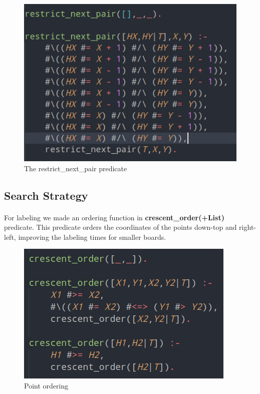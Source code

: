 \documentclass[runningheads]{llncs}
\begin{document}
\begin{figure}
    \begin{center}
        \includegraphics[scale=0.5]{images/restrictPair.png}
        \caption{The restrict\_next\_pair predicate} \label{fig3}
    \end{center}
\end{figure}

\subsection{Search Strategy}
\paragraph{}
For labeling we made an ordering function in \textbf{crescent\_order(+List)} predicate. This predicate orders the coordinates of the points
down-top and right-left, improving the labeling times for smaller boards.

\begin{figure}
    \begin{center}
        \includegraphics[scale=0.5]{images/crescent.png}
        \caption{Point ordering} \label{fig4}
    \end{center}
\end{figure}
\end{document}
